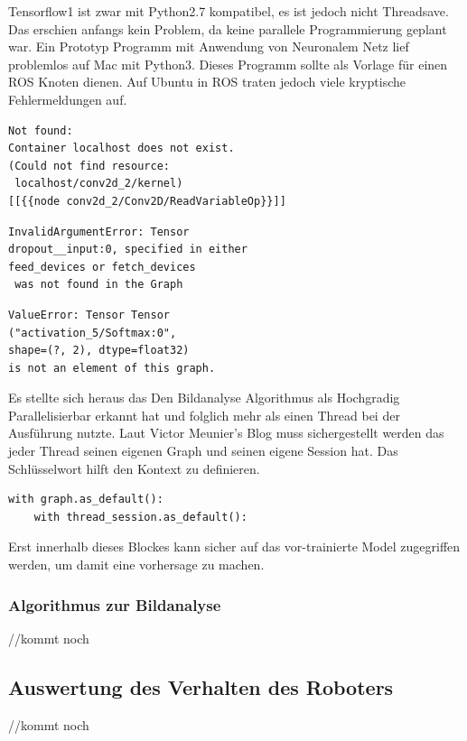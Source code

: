 \documentclass[conference]{IEEEtran}
\begin{document}
Tensorflow1 ist zwar mit Python2.7 kompatibel, es ist jedoch nicht Threadsave. Das erschien anfangs kein Problem, da keine parallele Programmierung geplant war. Ein Prototyp Programm mit Anwendung von Neuronalem Netz lief problemlos auf Mac mit Python3. Dieses Programm sollte als Vorlage für einen ROS Knoten dienen. Auf Ubuntu in ROS  traten jedoch viele kryptische Fehlermeldungen auf. 


\begin{verbatim}
Not found: 
Container localhost does not exist. 
(Could not find resource:
 localhost/conv2d_2/kernel)
[[{{node conv2d_2/Conv2D/ReadVariableOp}}]]
\end{verbatim}

\begin{verbatim}
InvalidArgumentError: Tensor 
dropout__input:0, specified in either 
feed_devices or fetch_devices
 was not found in the Graph
\end{verbatim}
\begin{verbatim}
ValueError: Tensor Tensor
("activation_5/Softmax:0",
shape=(?, 2), dtype=float32) 
is not an element of this graph.
\end{verbatim}

Es stellte sich heraus das %
Den Bildanalyse Algorithmus als Hochgradig Parallelisierbar erkannt hat und folglich mehr als einen Thread bei der Ausführung nutzte. 
Laut Victor Meunier's Blog %
muss sichergestellt werden das jeder Thread seinen eigenen Graph und seinen eigene Session hat.  Das Schlüsselwort  hilft den Kontext zu definieren. 

\begin{verbatim}
with graph.as_default():
	with thread_session.as_default():
\end{verbatim}
Erst innerhalb dieses Blockes kann sicher auf das vor-trainierte Model zugegriffen werden, um damit eine vorhersage zu machen.
\subsubsection{Algorithmus zur Bildanalyse }
//kommt noch 
\subsection {Auswertung des Verhalten des Roboters}	%
//kommt noch
\end{document}
